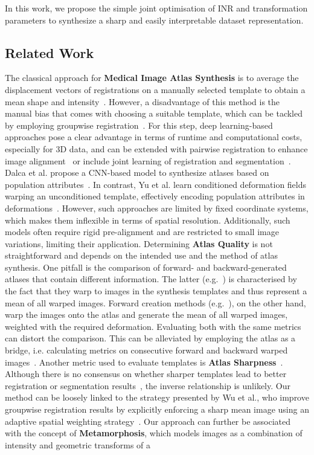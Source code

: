 In this work, we propose the simple joint optimisation of INR and transformation parameters to synthesize a sharp and easily interpretable dataset representation.




\subsection{Related Work}

The classical approach for \textbf{Medical Image Atlas Synthesis} is to average the displacement vectors of registrations on a manually selected template to obtain a mean shape and intensity~\cite{guimond2000average}. However, a disadvantage of this method is the manual bias that comes with choosing a suitable template, which can be tackled by employing groupwise registration~\cite{Joshi2004UnbiasedDA}. For this step, deep learning-based approaches pose a clear advantage in terms of runtime and computational costs, especially for 3D data, and can be extended with pairwise registration to enhance image alignment~\cite{ding2022aladdin} or include joint learning of registration and segmentation~\cite{sinclair2022atlas}. Dalca et al. propose a CNN-based model to synthesize atlases based on population attributes~\cite{dalca2019learning}. In contrast, Yu et al. learn conditioned deformation fields warping an unconditioned template, effectively encoding population attributes in deformations~\cite{yu2020learning}. However, such approaches are limited by fixed coordinate systems, which makes them inflexible in terms of spatial resolution. Additionally, such models often require rigid pre-alignment and are restricted to small image variations, limiting their application. Determining \textbf{Atlas Quality} is not straightforward and depends on the intended use and the method of atlas synthesis. One pitfall is the comparison of forward- and backward-generated atlases that contain different information. The latter (e.g.~\cite{He2020UnsupervisedEG,Joshi2004UnbiasedDA}) is characterised by the fact that they warp to images in the synthesis templates and thus represent a mean of all warped images. Forward creation methods (e.g.~\cite{dalca2019learning}), on the other hand, warp the images onto the atlas and generate the mean of all warped images, weighted with the required deformation. Evaluating both with the same metrics can distort the comparison. This can be alleviated by employing the atlas as a bridge, i.e. calculating metrics on consecutive forward and backward warped images~\cite{ding2022aladdin}. Another metric used to evaluate templates is \textbf{Atlas Sharpness}~\cite{lorenzen2005unbiased}. Although there is no consensus on whether sharper templates lead to better registration or segmentation results~\cite{ding2022aladdin,Yeo2007sharpness}, the inverse relationship is unlikely. Our method can be loosely linked to the strategy presented by Wu et al., who improve groupwise registration results by explicitly enforcing a sharp mean image using an adaptive spatial weighting strategy~\cite{wu2011sharpmean}. Our approach can further be associated with the concept of \textbf{Metamorphosis}, which models images as a combination of intensity and geometric transforms of a 